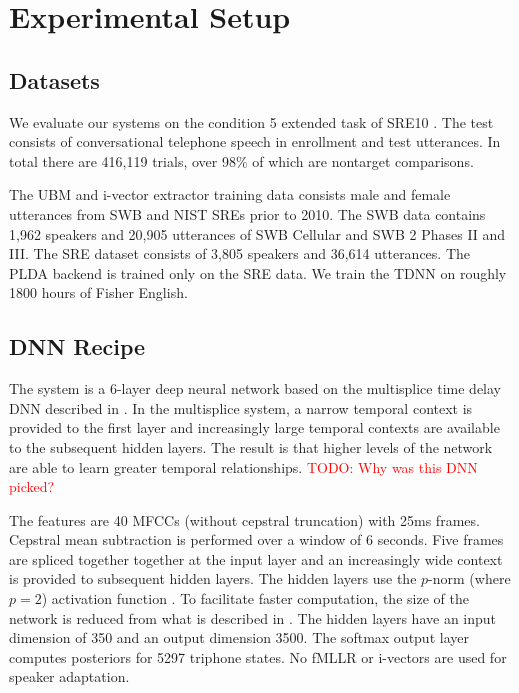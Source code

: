 \documentclass{article}
\newcommand\davidnote[1]{\textcolor{red}{#1}}
\begin{document}
\section{Experimental Setup}

\subsection{Datasets}
\label{datasets}
We evaluate our systems on the condition 5 extended task of 
SRE10 \cite{sre10}. The test consists of conversational telephone speech
in enrollment and test utterances. In total there are 416,119 trials,
over 98\% of which are nontarget comparisons. 

The UBM and i-vector extractor training data consists male and female
utterances from SWB and NIST SREs prior to 2010. The SWB data contains
1,962 speakers and 20,905 utterances of SWB Cellular and SWB 2 
Phases II and III. The SRE dataset consists of 3,805 speakers 
and 36,614 utterances.
The PLDA backend is trained only on the SRE data. 
We train the TDNN on roughly 1800 hours of Fisher English.

\subsection{DNN Recipe}
\label{dnn_recipe}

The system is a 6-layer deep neural network based on the multisplice 
time delay DNN described
in \cite{multisplice}. In the multisplice system, a narrow temporal
context is provided to the first layer and increasingly large temporal
contexts are available to the subsequent hidden layers. The result is that
higher levels of the network are able to learn greater temporal
relationships. \davidnote{TODO: Why was this DNN picked?}

The features are 40 MFCCs (without cepstral
truncation) with 25ms frames. Cepstral mean subtraction is 
performed over a window of
6 seconds. Five frames are spliced together together at the
input layer and an increasingly wide context is provided to 
subsequent hidden layers. The hidden layers use the $p$-norm (where $p=2$)
activation function \cite{pnorm}. 
To facilitate faster computation, the size of the network is reduced
from what is described in \cite{multisplice}. The hidden layers have an 
input dimension of 350 and an output dimension 3500. 
The softmax output layer computes posteriors for 5297 triphone states. No
fMLLR or i-vectors are used for speaker adaptation.
\end{document}
